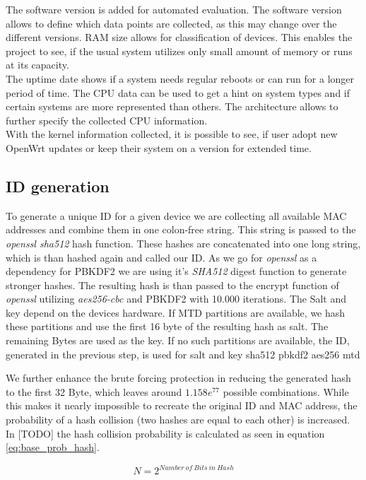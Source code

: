     The software version is added for automated evaluation. The software version allows to define which data points are collected, as this may change over the different versions. RAM size allows for classification of devices. This enables the project to see, if the usual system utilizes only small amount of memory or runs at its capacity.\\
    The uptime date shows if a system needs regular reboots or can run for a longer period of time. The CPU data can be used to get a hint on system types and if certain systems are more represented than others. The architecture allows to further specify the collected CPU information.\\
    With the kernel information collected, it is possible to see, if user adopt new OpenWrt updates or keep their system on a version for extended time.\\
%
\subsection{ID generation}
    To generate a unique ID for a given device we are collecting all available MAC addresses and combine them in one colon-free string. This string is passed to the \textit{openssl sha512} hash function. These hashes are concatenated into one long string, which is than hashed again and called our ID. As we go for \textit{openssl} as a dependency for PBKDF2 we are using it's \textit{SHA512} digest function to generate stronger hashes. The resulting hash is than passed to the encrypt function of \textit{openssl} utilizing \textit{aes256-cbc} and PBKDF2 with 10.000 iterations.
    The Salt and key depend on the devices hardware. If MTD partitions are available, we hash these partitions and use the first 16 byte of the resulting hash as salt. The remaining Bytes are used as the key. If no such partitions are available, the ID, generated in the  previous step, is used for salt and key
     sha512
     pbkdf2
     aes256
     mtd 
     
     We further enhance the brute forcing protection in reducing the generated hash to the first 32 Byte, which leaves around $1.158e^{77}$ possible combinations. While this makes it nearly impossible to recreate the original ID and MAC address, the probability of a hash collision (two hashes are equal to each other) is increased. In [TODO] the hash collision probability is calculated as seen in equation \ref{eq:base_prob_hash}.
     
     \begin{equation*}
         N = 2^{Number\ of\ Bits\ in\ Hash}
     \end{equation*}
     


